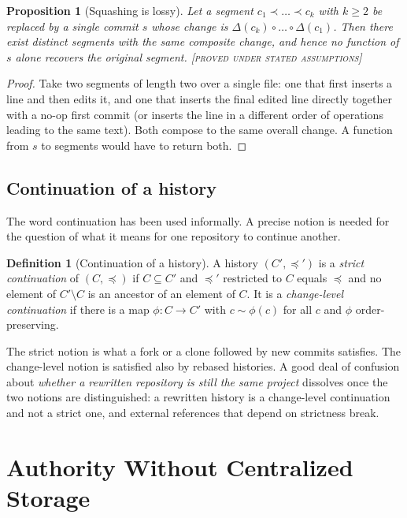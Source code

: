 \documentclass[11pt,twoside,openright]{book}
\theoremstyle{plain}
\newtheorem{proposition}[theorem]{Proposition}
\theoremstyle{definition}
\newtheorem{definition}[theorem]{Definition}
\theoremstyle{remark}
\newcommand{\Proved}{\textup{\textsc{[proved under stated assumptions]}}}
\newcommand{\anc}{\preceq}
\begin{document}
\begin{proposition}[Squashing is lossy]\label{prop:squash}
Let a segment $c_1\prec\dots\prec c_k$ with $k\ge 2$ be replaced by a single commit $s$ whose change is $\Delta(c_k)\circ\dots\circ\Delta(c_1)$. Then there exist distinct segments with the same composite change, and hence no function of $s$ alone recovers the original segment.
\Proved{}
\end{proposition}

\begin{proof}
Take two segments of length two over a single file: one that first inserts a line and then edits it, and one that inserts the final edited line directly together with a no-op first commit (or inserts the line in a different order of operations leading to the same text). Both compose to the same overall change. A function from $s$ to segments would have to return both.
\end{proof}

\section{Continuation of a history}

The word continuation has been used informally. A precise notion is needed for the question of what it means for one repository to continue another.

\begin{definition}[Continuation of a history]\label{def:histcont}
A history $(C',\anc')$ is a \emph{strict continuation} of $(C,\anc)$ if $C\subseteq C'$ and $\anc'$ restricted to $C$ equals $\anc$ and no element of $C'\setminus C$ is an ancestor of an element of $C$. It is a \emph{change-level continuation} if there is a map $\phi:C\to C'$ with $c\sim\phi(c)$ for all $c$ and $\phi$ order-preserving.
\end{definition}

The strict notion is what a fork or a clone followed by new commits satisfies. The change-level notion is satisfied also by rebased histories. A good deal of confusion about \emph{whether a rewritten repository is still the same project} dissolves once the two notions are distinguished: a rewritten history is a change-level continuation and not a strict one, and external references that depend on strictness break.

\chapter{Authority Without Centralized Storage}\label{ch:authority}
\end{document}
